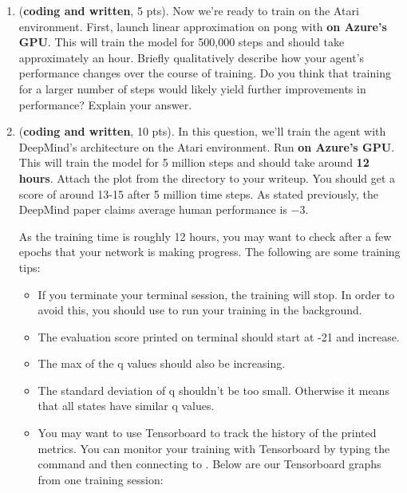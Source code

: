 \documentclass{article}
\newenvironment{myitemize}
{ \begin{itemize}
		\setlength{\itemsep}{0pt}
		\setlength{\parskip}{0pt}
		\setlength{\parsep}{0pt}     }
	{ \end{itemize}                  }
\begin{document}
\begin{enumerate}

\item (\textbf{coding and written}, 5 pts). Now we're ready to train on the Atari  environment. First, launch linear approximation on pong with  \textbf{on Azure's GPU}. This will train the model for 500,000 steps and should take approximately an hour.  Briefly qualitatively describe how your agent's performance changes over the course of training. Do you think that training for a larger number of steps would likely yield further improvements in performance? Explain your answer.

\item (\textbf{coding and written}, 10 pts). In this question, we'll train the agent with DeepMind's architecture on the Atari  environment. Run  \textbf{on Azure's GPU}.  This will train the model for 5 million steps and should take around \textbf{12 hours}.  Attach the plot  from the directory  to your writeup.
You should get a score of around 13-15 after 5 million time steps.  As stated previously, the DeepMind paper claims average human performance is $ -3 $.


As the training time is roughly 12 hours, you may want to check after a few epochs that your network is making progress.  The following are some training tips:

\begin{myitemize}
\item If you terminate your terminal session, the training will stop.  In order to avoid this, you should use  to run your training in the background.
\item The evaluation score printed on terminal should start at -21 and increase.
\item The max of the q values should also be increasing.
\item The standard deviation of q shouldn't be too small. Otherwise it means that all states have similar q values.
\item You may want to use Tensorboard to track the history of the printed metrics. You can monitor your training with Tensorboard by typing the command  and then connecting to .  Below are our Tensorboard graphs from one training session:
\end{myitemize}


\end{enumerate}
\end{document}
